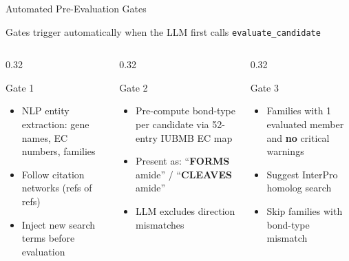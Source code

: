 \documentclass[aspectratio=169, 11pt]{beamer}
\begin{document}
\begin{frame}{Automated Pre-Evaluation Gates}
\begin{center}
\begin{tikzpicture}
\end{tikzpicture}
\end{center}

\vspace{-4pt}
{\centering\scriptsize\color{darkgray} Gates trigger automatically when the LLM first calls \texttt{evaluate\_candidate}\par}
\vspace{2pt}

\begin{columns}[T]
\begin{column}{0.32\textwidth}
\begin{block}{\scriptsize Gate 1}
\vspace{-2pt}
\begin{itemize}\scriptsize
\setlength\itemsep{0pt}
\item NLP entity extraction: gene names, EC numbers, families
\item Follow citation networks (refs of refs)
\item Inject new search terms before evaluation
\end{itemize}
\end{block}
\end{column}
\begin{column}{0.32\textwidth}
\begin{block}{\scriptsize Gate 2}
\vspace{-2pt}
\begin{itemize}\scriptsize
\setlength\itemsep{0pt}
\item Pre-compute bond-type per candidate via 52-entry IUBMB EC map
\item Present as: ``\textbf{FORMS} amide'' / ``\textbf{CLEAVES} amide''
\item LLM excludes direction mismatches
\end{itemize}
\end{block}
\end{column}
\begin{column}{0.32\textwidth}
\begin{block}{\scriptsize Gate 3}
\vspace{-2pt}
\begin{itemize}\scriptsize
\setlength\itemsep{0pt}
\item Families with 1 evaluated member and \textbf{no} critical warnings
\item Suggest InterPro homolog search
\item Skip families with bond-type mismatch
\end{itemize}
\end{block}
\end{column}
\end{columns}
\end{frame}
\end{document}
